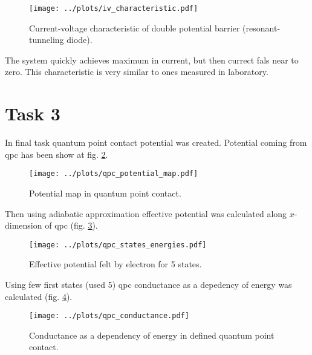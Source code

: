\documentclass[12pt, a4paper]{article}
\begin{document}
\begin{figure}[ht]
    \begin{center}
        \texttt{[image: ../plots/iv\_characteristic.pdf]}
    \end{center}
    \caption{Current-voltage characteristic of double potential barrier (resonant-tunneling diode).}
    \label{fig:tsu_esaki}
\end{figure}

The system quickly achieves maximum in current, but then currect fals near to zero.
This characteristic is very similar to ones measured in laboratory.

\section*{Task 3}

In final task quantum point contact potential was created.
Potential coming from qpc has been show at fig. \ref{fig:qpc_potential}.

\begin{figure}[h]
    \begin{center}
        \texttt{[image: ../plots/qpc\_potential\_map.pdf]}
    \end{center}
    \caption{Potential map in quantum point contact.}
    \label{fig:qpc_potential}
\end{figure}

Then using adiabatic approximation effective potential was calculated along $x$-dimension of qpc (fig. \ref{fig:qpc_eff_pot}).

\begin{figure}[ht]
    \begin{center}
        \texttt{[image: ../plots/qpc\_states\_energies.pdf]}
    \end{center}
    \caption{Effective potential felt by electron for 5 states.}
    \label{fig:qpc_eff_pot}
\end{figure}

Using few first states (used 5) qpc conductance as a depedency of energy was calculated (fig. \ref{fig:cond}).

\begin{figure}[ht]
    \begin{center}
        \texttt{[image: ../plots/qpc\_conductance.pdf]}
    \end{center}
    \caption{Conductance as a dependency of energy in defined quantum point contact.}
    \label{fig:cond}
\end{figure}
\end{document}
